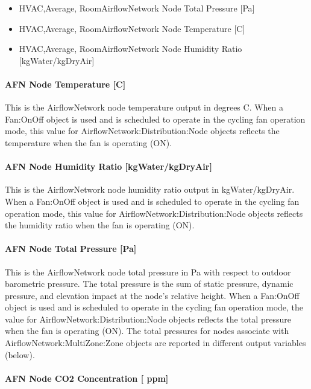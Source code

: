 \begin{itemize}
\item
  HVAC,Average, RoomAirflowNetwork Node Total Pressure {[}Pa{]}
\item
  HVAC,Average, RoomAirflowNetwork Node Temperature {[}C{]}
\item
  HVAC,Average, RoomAirflowNetwork Node Humidity Ratio {[}kgWater/kgDryAir{]}
\end{itemize}

\paragraph{AFN Node Temperature {[}C{]}}\label{afn-node-temperature-c}

This is the AirflowNetwork node temperature output in degrees C. When a Fan:OnOff object is used and is scheduled to operate in the cycling fan operation mode, this value for AirflowNetwork:Distribution:Node objects reflects the temperature when the fan is operating (ON).

\paragraph{AFN Node Humidity Ratio {[}kgWater/kgDryAir{]}}\label{afn-node-humidity-ratio-kgwaterkgdryair}

This is the AirflowNetwork node humidity ratio output in kgWater/kgDryAir. When a Fan:OnOff object is used and is scheduled to operate in the cycling fan operation mode, this value for AirflowNetwork:Distribution:Node objects reflects the humidity ratio when the fan is operating (ON).

\paragraph{AFN Node Total Pressure {[}Pa{]}}\label{afn-node-total-pressure-pa}

This is the AirflowNetwork node total pressure in Pa with respect to outdoor barometric pressure. The total pressure is the sum of static pressure, dynamic pressure, and elevation impact at the node's relative height. When a Fan:OnOff object is used and is scheduled to operate in the cycling fan operation mode, the value for AirflowNetwork:Distribution:Node objects reflects the total pressure when the fan is operating (ON). The total pressures for nodes associate with AirflowNetwork:MultiZone:Zone objects are reported in different output variables (below).

\paragraph{AFN Node CO2 Concentration {[} ppm{]}}\label{afn-node-co2-concentration-ppm}

